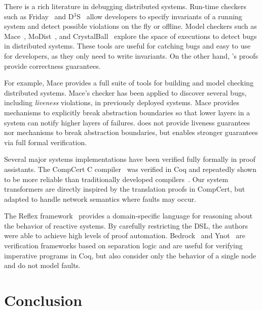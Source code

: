  There is a rich literature in
debugging distributed systems.  Run-time checkers such as
Friday~\cite{geels:friday} and D$^3$S~\cite{liu:d3s} allow developers
to specify invariants of a running system and detect possible
violations on the fly or offline.  Model checkers such as
Mace~\cite{killian:mace, killian:macemc}, MoDist~\cite{yang:modist},
and CrystalBall~\cite{yabandeh:crystalball} explore the space of
executions to detect bugs in distributed systems.  These tools are
useful for catching bugs and easy to use for developers, as they only
need to write invariants.  On the other hand, \Verdi's proofs provide
correctness guarantees.

For example, Mace provides a full suite of tools for building and model
checking distributed systems.  Mace's checker has been applied to discover
several bugs, including \emph{liveness} violations, in previously deployed
systems. Mace provides mechanisms to explicitly break abstraction
boundaries so that lower layers in a system can notify higher layers of
failures.  \Verdi does not provide liveness guarantees nor mechanisms to
break abstraction boundaries, but enables stronger guarantees via full
formal verification.

 Several major systems implementations have been
verified fully formally in proof assistants.  The CompCert C
compiler~\cite{leroy:compcert} was verified in
Coq and repeatedly shown to be more reliable than traditionally
developed compilers~\cite{yang:csmith,vu:emi}. Our system transformers
are directly inspired by the translation proofs in CompCert, but
adapted to handle network semantics where faults may occur.

The Reflex framework~\cite{ricketts:reflex} provides a domain-specific
language for reasoning about the behavior of reactive systems.  By
carefully restricting the DSL, the authors were able to achieve high
levels of proof automation.  Bedrock~\cite{chlipala:bedrock} and
Ynot~\cite{nanevski:ynot} are verification frameworks based on
separation logic and are useful for verifying imperative programs in
Coq, but also consider only the behavior of a single node and do not
model faults.


\section{Conclusion}\label{sec:verdi:conclusion}

